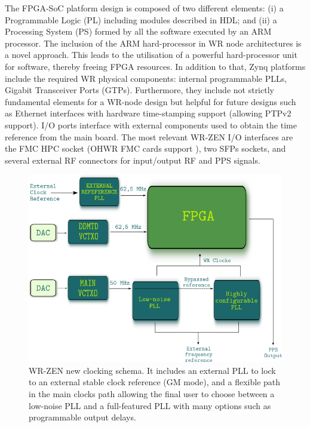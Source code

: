 The FPGA-SoC platform design is composed of two different elements: (i) a
Programmable Logic (PL) including modules described in HDL; and (ii) a
Processing System (PS) formed by all the software executed by an ARM
processor.  The inclusion of the ARM hard-processor in WR node
architectures is a novel approach.  This leads to the utilisation of a powerful
hard-processor unit for software, thereby freeing FPGA resources. In addition
to that, Zynq platforms include the required WR physical components: 
internal programmable PLLs, Gigabit Transceiver Ports (GTPs).
Furthermore, they include not strictly fundamental elements for a WR-node design but helpful for
future designs such as Ethernet interfaces with hardware time-stamping support
(allowing PTPv2 support). I/O ports interface with external components used to obtain the time reference from the
main board. The most relevant WR-ZEN I/O interfaces are the FMC HPC
socket (OHWR FMC cards support
\cite{ohwr:fmc-fine-delay}), two SFPs sockets, and
several external RF connectors for input/output RF and PPS signals.

\begin{figure} \centering
	\includegraphics[width=0.7\linewidth]{img/zenclkschema} \caption[WR-ZEN
	clocking schema]{WR-ZEN new clocking schema. 
	It includes an external PLL to lock to an external
	stable clock reference (GM mode), and a flexible path in the main
	clocks path allowing the final user to choose between a low-noise PLL
	and a full-featured PLL with many options such as programmable output
delays.} \label{fig:zenclkschema} \end{figure}

